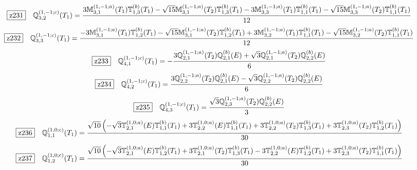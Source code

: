 \documentclass[fleqn,10pt,landscape]{jsarticle}
\begin{document}
\begin{dmath*}
\hspace*{3mm}\fbox{z231}\quad \mathbb{Q}_{3,2}^{(1,-1;c)}(T_{1})=\frac{3 \mathbb{M}_{3,1}^{(1,-1;a)}(T_{1}) \mathbb{T}_{1,3}^{(b)}(T_{1}) - \sqrt{15} \mathbb{M}_{3,1}^{(1,-1;a)}(T_{2}) \mathbb{T}_{1,3}^{(b)}(T_{1}) - 3 \mathbb{M}_{3,3}^{(1,-1;a)}(T_{1}) \mathbb{T}_{1,1}^{(b)}(T_{1}) - \sqrt{15} \mathbb{M}_{3,3}^{(1,-1;a)}(T_{2}) \mathbb{T}_{1,1}^{(b)}(T_{1})}{12}
\end{dmath*}
\begin{dmath*}
\hspace*{3mm}\fbox{z232}\quad \mathbb{Q}_{3,3}^{(1,-1;c)}(T_{1})=\frac{- 3 \mathbb{M}_{3,1}^{(1,-1;a)}(T_{1}) \mathbb{T}_{1,2}^{(b)}(T_{1}) - \sqrt{15} \mathbb{M}_{3,1}^{(1,-1;a)}(T_{2}) \mathbb{T}_{1,2}^{(b)}(T_{1}) + 3 \mathbb{M}_{3,2}^{(1,-1;a)}(T_{1}) \mathbb{T}_{1,1}^{(b)}(T_{1}) - \sqrt{15} \mathbb{M}_{3,2}^{(1,-1;a)}(T_{2}) \mathbb{T}_{1,1}^{(b)}(T_{1})}{12}
\end{dmath*}
\begin{dmath*}
\hspace*{3mm}\fbox{z233}\quad \mathbb{Q}_{4,1}^{(1,-1;c)}(T_{1})=- \frac{3 \mathbb{Q}_{2,1}^{(1,-1;a)}(T_{2}) \mathbb{Q}_{2,1}^{(b)}(E) + \sqrt{3} \mathbb{Q}_{2,1}^{(1,-1;a)}(T_{2}) \mathbb{Q}_{2,2}^{(b)}(E)}{6}
\end{dmath*}
\begin{dmath*}
\hspace*{3mm}\fbox{z234}\quad \mathbb{Q}_{4,2}^{(1,-1;c)}(T_{1})=\frac{3 \mathbb{Q}_{2,2}^{(1,-1;a)}(T_{2}) \mathbb{Q}_{2,1}^{(b)}(E) - \sqrt{3} \mathbb{Q}_{2,2}^{(1,-1;a)}(T_{2}) \mathbb{Q}_{2,2}^{(b)}(E)}{6}
\end{dmath*}
\begin{dmath*}
\hspace*{3mm}\fbox{z235}\quad \mathbb{Q}_{4,3}^{(1,-1;c)}(T_{1})=\frac{\sqrt{3} \mathbb{Q}_{2,3}^{(1,-1;a)}(T_{2}) \mathbb{Q}_{2,2}^{(b)}(E)}{3}
\end{dmath*}
\begin{dmath*}
\hspace*{3mm}\fbox{z236}\quad \mathbb{Q}_{1,1}^{(1,0;c)}(T_{1})=\frac{\sqrt{10} \left(- \sqrt{3} \mathbb{T}_{2,1}^{(1,0;a)}(E) \mathbb{T}_{1,1}^{(b)}(T_{1}) + 3 \mathbb{T}_{2,2}^{(1,0;a)}(E) \mathbb{T}_{1,1}^{(b)}(T_{1}) + 3 \mathbb{T}_{2,2}^{(1,0;a)}(T_{2}) \mathbb{T}_{1,3}^{(b)}(T_{1}) + 3 \mathbb{T}_{2,3}^{(1,0;a)}(T_{2}) \mathbb{T}_{1,2}^{(b)}(T_{1})\right)}{30}
\end{dmath*}
\begin{dmath*}
\hspace*{3mm}\fbox{z237}\quad \mathbb{Q}_{1,2}^{(1,0;c)}(T_{1})=\frac{\sqrt{10} \left(- \sqrt{3} \mathbb{T}_{2,1}^{(1,0;a)}(E) \mathbb{T}_{1,2}^{(b)}(T_{1}) + 3 \mathbb{T}_{2,1}^{(1,0;a)}(T_{2}) \mathbb{T}_{1,3}^{(b)}(T_{1}) - 3 \mathbb{T}_{2,2}^{(1,0;a)}(E) \mathbb{T}_{1,2}^{(b)}(T_{1}) + 3 \mathbb{T}_{2,3}^{(1,0;a)}(T_{2}) \mathbb{T}_{1,1}^{(b)}(T_{1})\right)}{30}
\end{dmath*}
\end{document}
